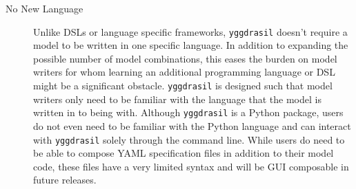 \documentclass[journal]{IEEEtran}
\newcommand{\pkg}{{\tt yggdrasil}{}}
\begin{document}
\begin{description}
	\item[No New Language] Unlike DSLs or language specific frameworks, {\pkg} doesn't require a model to be written in one specific language. In addition to expanding the possible number of model combinations, this eases the burden on model writers for whom learning an additional programming language or DSL might be a significant obstacle. {\pkg} is designed such that model writers only need to be familiar with the language that the model is written in to being with. Although {\pkg} is a Python package, users do not even need to be familiar with the Python language and can interact with {\pkg} solely through the command line. While users do need to be able to compose YAML specification files in addition to their model code, these files have a very limited syntax and will be GUI composable in future releases.
\end{description}
\end{document}
